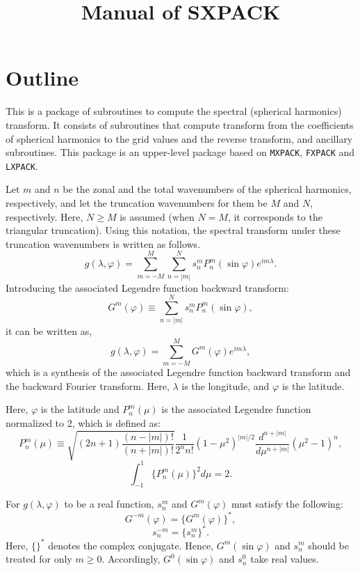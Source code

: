 \documentclass[a4paper]{scrartcl}
\title{Manual of SXPACK}
\author{}
\date{}
\begin{document}
\maketitle

\section{Outline}

This is a package of subroutines to compute the spectral (spherical
harmonics) transform. It consists of subroutines that compute
transform from the coefficients of spherical harmonics to the grid 
values and the reverse transform, and ancillary subroutines.
This package is an upper-level package based on \texttt{MXPACK},
\texttt{FXPACK} and \texttt{LXPACK}.

Let $m$ and $n$ be the zonal and the total wavenumbers of
the spherical harmonics, respectively, and 
let the truncation wavenumbers for them be $M$ and $N$,
respectively. Here, $N\ge M$ is assumed (when $N=M$, it corresponds
to the triangular truncation).
Using this notation, the spectral transform
under these truncation wavenumbers is written as follows.
\begin{equation}
g(\lambda,\varphi)=\sum^M_{m=-M}\sum^N_{n=|m|}
s^m_nP^m_n(\sin\varphi)e^{im\lambda}.
\end{equation}
Introducing the associated Legendre function backward transform:
\begin{equation}
G^m(\varphi)\equiv\sum^N_{n=|m|}s^m_nP^m_n(\sin\varphi),
\end{equation}
it can be written as,
\begin{equation}
g(\lambda,\varphi)=\sum^M_{m=-M}G^m(\varphi)e^{im\lambda},
\end{equation}
which is a synthesis of 
the associated Legendre function backward transform
and the backward Fourier transform.
Here, $\lambda$ is the longitude, and $\varphi$ is the latitude.

Here, $\varphi$ is the latitude and
$P^m_n(\mu)$ is the associated Legendre function normalized to 2,
which is defined as:
\begin{equation}
P^m_n(\mu)\equiv\sqrt{(2n+1)\frac{(n-|m|)!}{(n+|m|)!}}
\frac1{2^nn!}(1-\mu^2)^{|m|/2}
\frac{d^{n+|m|}}{d\mu^{n+|m|}}(\mu^2-1)^n,
\end{equation}
\begin{equation}
\int^1_{-1}\{P^m_n(\mu)\}^2d\mu=2.
\end{equation}

For $g(\lambda,\varphi)$ to be a real function,
$s^m_n$ and $G^m(\varphi)$ must satisfy the following:
\begin{equation}
G^{-m}(\varphi)=\{G^m(\varphi)\}^{*},
\end{equation}
\begin{equation}
s^{-m}_n=\{s^m_n\}^{*}.
\end{equation}
Here, $\{ \}^{*}$ denotes the complex conjugate.
Hence, $G^m(\sin\varphi)$ and $s^m_n$ should be
treated for only $m\ge 0$.
Accordingly, $G^0(\sin\varphi)$ and $s^0_n$ take real values.
\end{document}
